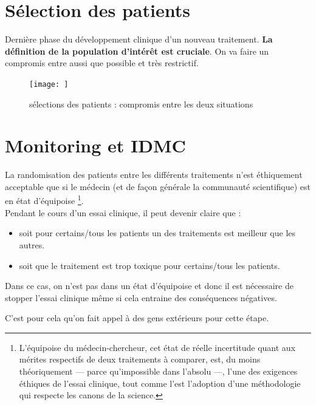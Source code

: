 \section{Sélection des patients}
Dernière phase du développement clinique d’un nouveau traitement. \textbf{La définition de la population d’intérêt est cruciale}. On va faire un compromis entre aussi que possible et très restrictif.

\begin{figure}
    \centering
    \texttt{[image: ]}
    \caption{sélections des patients : compromis entre les deux situations}
    \label{fig:my_label}
\end{figure}


\section{Monitoring et IDMC}
La randomisation des patients entre les différents traitements n’est éthiquement acceptable que si le médecin (et de façon générale la communauté scientifique) est en état d’équipoise \footnote{L’équipoise du médecin-chercheur, cet état de réelle incertitude quant aux mérites respectifs de deux traitements à comparer, est, du moins théoriquement — parce qu’impossible dans l’absolu —, l’une des exigences éthiques de l’essai clinique, tout comme l’est l’adoption d’une méthodologie qui respecte les canons de la science.}.\\
Pendant le cours d'un essai clinique, il peut devenir claire que :
\begin{itemize}
    \item soit pour certains/tous les patients un des traitements est meilleur que les autres.
    \item soit que le traitement est trop toxique pour certains/tous les patients.
\end{itemize}

Dans ce cas, on n'est pas dans un état d'équipoise et donc il est nécessaire de stopper l'essai clinique même si cela entraine des conséquences négatives.

C'est pour cela qu'on fait appel à des gens extérieurs pour cette étape.





